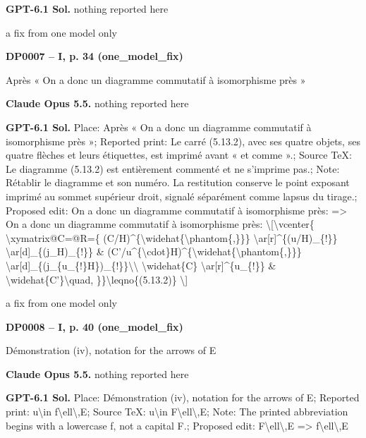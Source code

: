\textbf{GPT-6.1 Sol.} nothing reported here\par
a fix from one model only\par
\par\noindent\hypertarget{DP0007}{}\textbf{DP0007 -- I, p. 34 (one\_model\_fix)}\par
Après « On a donc un diagramme commutatif à isomorphisme près »\par
\textbf{Claude Opus 5.5.} nothing reported here\par
\textbf{GPT-6.1 Sol.} Place: Après « On a donc un diagramme commutatif à isomorphisme près »; Reported print: Le carré (5.13.2), avec ses quatre objets, ses quatre flèches et leurs étiquettes, est imprimé avant « et comme ».; Source TeX: Le diagramme (5.13.2) est entièrement commenté et ne s'imprime pas.; Note: Rétablir le diagramme et son numéro. La restitution conserve le point exposant imprimé au sommet supérieur droit, signalé séparément comme lapsus du tirage.; Proposed edit: On a donc un diagramme commutatif à isomorphisme près: =\allowbreak > On a donc un diagramme commutatif à isomorphisme près: \textbackslash{}[\textbackslash{}vcenter\{ \textbackslash{}xymatrix@C=\allowbreak 2.5cm@R=\allowbreak 1.5cm\{ (C/H)\textasciicircum{}\{\textbackslash{}widehat\{\textbackslash{}phantom\{,\}\}\} \textbackslash{}ar[r]\textasciicircum{}\{(u/H)\_\{!\}\} \textbackslash{}ar[d]\_\{(j\_H)\_\{!\}\} \& (C'/u\textasciicircum{}\{\textbackslash{}cdot\}H)\textasciicircum{}\{\textbackslash{}widehat\{\textbackslash{}phantom\{,\}\}\} \textbackslash{}ar[d]\_\{(j\_\{u\_\{!\}H\})\_\{!\}\}\textbackslash{}\textbackslash{} \textbackslash{}widehat\{C\} \textbackslash{}ar[r]\textasciicircum{}\{u\_\{!\}\} \& \textbackslash{}widehat\{C'\}\textbackslash{}quad, \}\}\textbackslash{}leqno\{(5.13.2)\} \textbackslash{}]\par
a fix from one model only\par
\par\noindent\hypertarget{DP0008}{}\textbf{DP0008 -- I, p. 40 (one\_model\_fix)}\par
Démonstration (iv), notation for the arrows of E\par
\textbf{Claude Opus 5.5.} nothing reported here\par
\textbf{GPT-6.1 Sol.} Place: Démonstration (iv), notation for the arrows of E; Reported print: u\textbackslash{}in f\textbackslash{}ell\textbackslash{},E; Source TeX: u\textbackslash{}in F\textbackslash{}ell\textbackslash{},E; Note: The printed abbreviation begins with a lowercase f, not a capital F.; Proposed edit: F\textbackslash{}ell\textbackslash{},E =\allowbreak > f\textbackslash{}ell\textbackslash{},E\par
